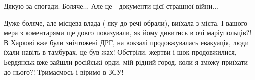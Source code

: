  
 
 
 
 

\qqSecCmt


Дякую за спогади. Боляче... Але це - документи цієї страшної війни...


Дуже боляче, але місцева влада ( яку до речі обрали), виїхала з міста. І
вашого мера з коментарями ще довго показували, як йому дивитись в очі
маріупольців?! В Харкові вже були знічтожені ДРГ, на вокзалі продовжувалась
евакуація, люди їхали навіть в тамбурах, це був жах! Обстріли, жертви і шок
продовжилися, Бердянськ вже зайшли російські орди, мій рідний город, коли я
зможу приїхати до нього?! Тримаємось і віримо в ЗСУ!
